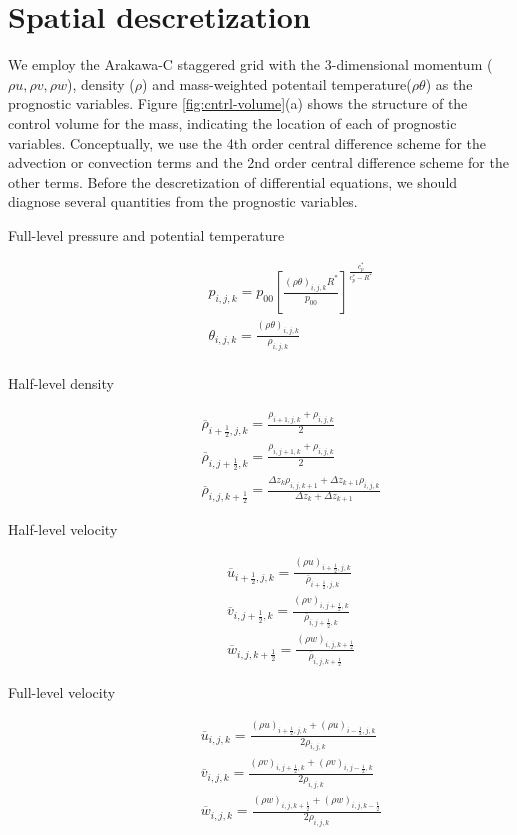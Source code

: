 \section{Spatial descretization}
We employ the Arakawa-C staggered grid with the 3-dimensional momentum
($\rho u, \rho v, \rho w$), density ($\rho$) and mass-weighted potentail temperature($\rho \theta$)
as the prognostic variables.
Figure \ref{fig:cntrl-volume}(a) shows the structure of the control volume for the mass,
indicating the location of each of prognostic variables.
Conceptually, we use the 4th order central difference scheme
for the advection or convection terms and
the 2nd order central difference scheme for the other terms.
Before the descretization of differential equations,
we should diagnose several quantities from the prognostic variables.
\begin{description}
\item[Full-level pressure and potential temperature]
\begin{eqnarray}
&&p_{i,j,k}=p_{00}\left[\frac{(\rho \theta)_{i,j,k} R^*}{p_{00}} \right]^{\frac{c_{p}^*}{c_{p}^*- R^*}}\\
&&\theta_{i,j,k} = \frac{(\rho \theta)_{i,j,k}}{\rho_{i,j,k}} \label{eq:theta full} \\
\end{eqnarray}
\item[Half-level density]
\begin{eqnarray}
&&  \overline{\rho}_{i+\frac{1}{2},j,k} = \frac{\rho_{i+1,j,k}+\rho_{i,j,k}}{2} \label{eq:rho half i} \\
&&  \overline{\rho}_{i,j+\frac{1}{2},k} = \frac{\rho_{i,j+1,k}+\rho_{i,j,k}}{2} \label{eq:rho half j} \\
&&  \overline{\rho}_{i,j,k+\frac{1}{2}} = \frac{\Delta z_k\rho_{i,j,k+1}+\Delta z_{k+1}\rho_{i,j,k}}{\Delta z_k + \Delta z_{k+1}} \label{eq:rho half k}
\end{eqnarray}
\item[Half-level velocity]
\begin{eqnarray}
&&  \overline{u}_{i+\frac{1}{2},j,k} = \frac{(\rho u)_{i+\frac{1}{2},j,k}}{\overline{\rho}_{i+\frac{1}{2},j,k}}\\
&&  \overline{v}_{i,j+\frac{1}{2},k} = \frac{(\rho v)_{i,j+\frac{1}{2},k}}{\overline{\rho}_{i,j+\frac{1}{2},k}}\\
&&  \overline{w}_{i,j,k+\frac{1}{2}} = \frac{(\rho w)_{i,j,k+\frac{1}{2}}}{\overline{\rho}_{i,j,k+\frac{1}{2}}}
\end{eqnarray}
\item[Full-level velocity]
\begin{eqnarray}
&&  \overline{u}_{i,j,k} = \frac{(\rho u)_{i+\frac{1}{2},j,k}+(\rho u)_{i-\frac{1}{2},j,k}}{2\rho_{i,j,k}} \label{eq:u full} \\
&&  \overline{v}_{i,j,k} = \frac{(\rho v)_{i,j+\frac{1}{2},k}+(\rho v)_{i,j-\frac{1}{2},k}}{2\rho_{i,j,k}} \label{eq:v full} \\
&&  \overline{w}_{i,j,k} = \frac{(\rho w)_{i,j,k+\frac{1}{2}}+(\rho w)_{i,j,k-\frac{1}{2}}}{2\rho_{i,j,k}} \label{eq:w full}
\end{eqnarray}
\end{description}




